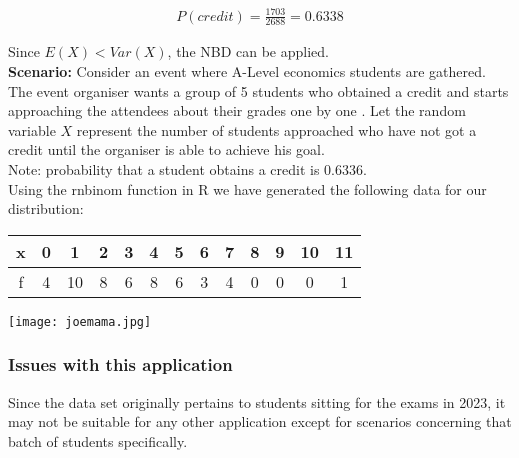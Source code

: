 \documentclass{article}
\begin{document}
\begin{gather*}
  P(credit) = \frac{1703}{2688} = 0.6338
\end{gather*}

Since $ E(X) < Var(X) $, the NBD can be applied. \\



\textbf{Scenario:} Consider an event
where A-Level economics students are gathered. The event organiser
wants a group of 5 students who obtained a credit and starts 
approaching the attendees about their grades one by one
. Let the random variable
$ X $ represent the number of students approached
who have not got a credit until the organiser
is able to achieve his goal.  \\

Note: probability that a student obtains a credit is 0.6336.
\\



Using the rnbinom function in R we have generated the following
data for our distribution:

\begin{center}
  \begin{tabular}{|c|c|c|c|c|c|c|c|c|c|c|c|c|}
    \hline
    x & 0 & 1 & 2 & 3 & 4 & 5 & 6 & 7 & 8 & 9 & 10 & 11 \\
    \hline
    f & 4 & 10 & 8 & 6 & 8 & 6 & 3 & 4 & 0 & 0 & 0 & 1\\
    \hline
  \end{tabular}
\end{center}


\begin{center}
  \texttt{[image: joemama.jpg]}
\end{center}

\subsubsection{Issues with this application}
Since the data set originally pertains to students sitting for
the exams in 2023, it may not be suitable for any other application
except for scenarios concerning that batch of students specifically.
\end{document}
